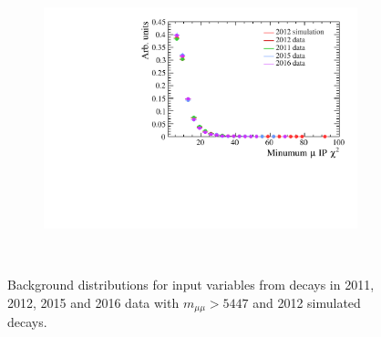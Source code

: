 \begin{figure}
 \begin{subfigure}[b]{0.48\textwidth}
        \includegraphics[width=\textwidth]{./Figs/Selection/bkgnd_muIPS.pdf}
        \caption{ }
        \label{fig:BDTsig}
    \end{subfigure}
    ~ %
 



    \caption{Background distributions for input variables from \bbbarmumux decays in 2011, 2012, 2015 and 2016 data with $m_{\mu \mu} > 5447$ \mevcc and 2012 simulated \bbbarmumux decays.}
    \label{fig:signalvars}
\end{figure}
